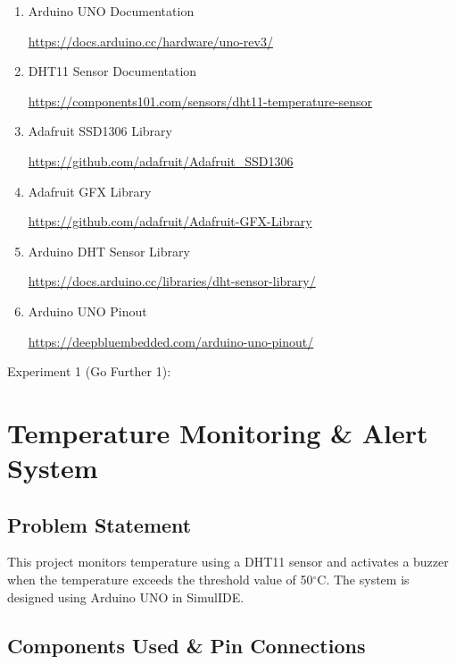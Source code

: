 \begin{enumerate}

\item Arduino UNO Documentation

\url{https://docs.arduino.cc/hardware/uno-rev3/}

\item DHT11 Sensor Documentation

\url{https://components101.com/sensors/dht11-temperature-sensor}

\item Adafruit SSD1306 Library

\url{https://github.com/adafruit/Adafruit_SSD1306}

\item Adafruit GFX Library

\url{https://github.com/adafruit/Adafruit-GFX-Library}

\item Arduino DHT Sensor Library

\url{https://docs.arduino.cc/libraries/dht-sensor-library/}

\item Arduino UNO Pinout

\url{https://deepbluembedded.com/arduino-uno-pinout/}

\end{enumerate}


\clearpage
Experiment 1 (Go Further 1):

\section{Temperature Monitoring \& Alert System}

\subsection{Problem Statement}

This project monitors temperature using a DHT11 sensor and activates a buzzer when the temperature exceeds the threshold value of 50$^\circ$C. The system is designed using Arduino UNO in SimulIDE.


\subsection{Components Used \& Pin Connections}

